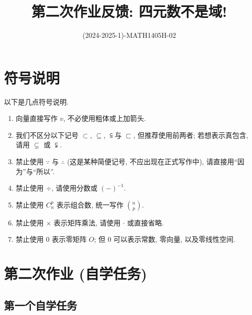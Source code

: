 \documentclass[11pt]{ctexart}
\title{第二次作业反馈: \textbf{四元数不是域!}}
\author{(2024-2025-1)-MATH1405H-02}
\theoremstyle{definition}
\numberwithin{equation}{section}
\theoremstyle{definition}
\theoremstyle{remark}
\begin{document}
\maketitle

\tableofcontents

\newpage

\section{符号说明}

以下是几点符号说明. 

    \begin{enumerate}
        \item 向量直接写作 $v$, 不必使用粗体或上加箭头. 
        \item 我们不区分以下记号 $\subset$, $\subseteq$, $\subseteqq$与 $\sqsubset$, 但推荐使用前两者; 若想表示真包含, 请用 $\subsetneq$ 或 $\subsetneqq$. 
        \item 禁止使用 $\because$ 与 $\therefore$ (这是某种简便记号, 不应出现在正式写作中), 请直接用``因为''与``所以''. 
        \item 禁止使用 $\div$, 请使用分数或 $(-)^{-1}$. 
        \item 禁止使用 $C_n^p$ 表示组合数, 统一写作 $\binom np$. 
        \item 禁止使用 $\times$ 表示矩阵乘法, 请使用 $\cdot$ 或直接省略.  
        \item 禁止使用 $0$ 表示零矩阵 $O$; 但 $0$ 可以表示常数, 零向量, 以及零线性空间. 
    \end{enumerate}

\section{第二次作业 (自学任务)}

\subsection{第一个自学任务} 
\end{document}
